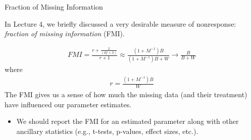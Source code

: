 \documentclass{beamer}\usepackage[]{graphicx}\usepackage[]{color}
\begin{document}

\begin{frame}{Fraction of Missing Information}
  
  In Lecture 4, we briefly discussed a very desirable measure of nonresponse: 
  \emph{fraction of missing information} (FMI).
  
  \begin{align*}
    FMI = \frac{r + \frac{2}{(df + 3)}}{r + 1} \approx \frac{(1 + M^{-1})B}{(1 + M^{-1})B + W} \rightarrow \frac{B}{B + W}
  \end{align*}
  where
  \begin{align*}
    r = \frac{(1 + M^{-1})B}{W}
  \end{align*}
  The FMI gives us a sense of how much the missing data (and their treatment) 
  have influenced our parameter estimates.
  \vc
  \begin{itemize}
  \item We should report the FMI for an estimated parameter along with other 
    ancillary statistics (e.g., t-tests, p-values, effect sizes, etc.).
  \end{itemize}
  
\end{frame}

\end{document}
